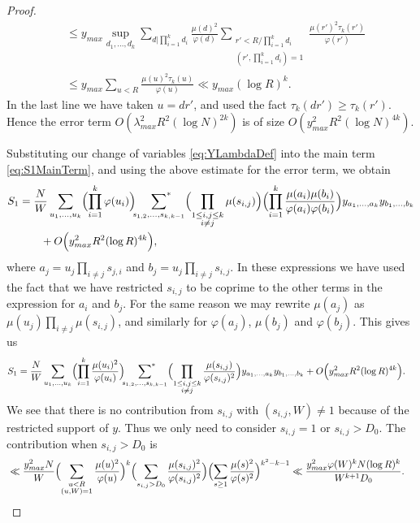 \documentclass[12pt,a4paper]{amsart}
\theoremstyle{plain}
\numberwithin{sblmm}{thrm}
\numberwithin{equation}{section}
\renewcommand{\phi}{\varphi}
\begin{document}
\begin{proof}
\begin{align}
&\le y_{max} \sup_{d_1,\dotsc,d_k}\sum_{d|\prod_{i=1}^kd_i}\frac{\mu(d)^2}{\phi(d)}\sum_{\substack{r'<R/\prod_{i=1}^kd_i\\ (r',\prod_{i=1}^kd_i)=1}}\frac{\mu(r')^2\tau_k(r')}{\phi(r')}\nonumber\\
&\le y_{max}\sum_{u<R}\frac{\mu(u)^2\tau_k(u)}{\phi(u)}\ll y_{max}(\log{R})^k.\label{eq:LambdaSize}
\end{align} 
In the last line we have taken $u=dr'$, and used the fact $\tau_k(dr')\ge\tau_k(r')$. Hence the error term $O(\lambda_{max}^2R^2(\log{N})^{2k})$ is of size $O( y_{max}^2R^2(\log{N})^{4k})$.

Substituting our change of variables \eqref{eq:YLambdaDef} into the main term \eqref{eq:S1MainTerm}, and using the above estimate for the error term, we obtain
\begin{align}
S_1&=\frac{N}{W}\sum_{u_1,\dotsc,u_k}\Bigl(\prod_{i=1}^k\phi(u_i)\Bigr)\sideset{}{^*}\sum_{s_{1,2},\dotsc, s_{k,k-1}} \Bigl(\prod_{\substack{1\le i,j\le k\\i\ne j}}\mu(s_{i,j})\Bigr)\Bigl(\prod_{i=1}^k\frac{\mu(a_i)\mu(b_i)}{\phi(a_i)\phi(b_i)}\Bigr)y_{a_1,\dotsc,a_k}y_{b_1,\dotsc,b_k}\nonumber\\
&\qquad+O\Bigl(y_{max}^2R^2(\log{R})^{4k}\Bigr),
\end{align}
where $a_j=u_j\prod_{i\ne j}s_{j,i}$ and $b_j=u_j\prod_{i\ne j}s_{i,j}$. In these expressions we have used the fact that we have restricted $s_{i,j}$ to be coprime to the other terms in the expression for $a_i$ and $b_j$. For the same reason we may rewrite $\mu(a_j)$ as $\mu(u_j)\prod_{i\ne j}\mu(s_{i,j})$, and similarly for $\phi(a_j)$, $\mu(b_j)$ and $\phi(b_j)$. This gives us
\begin{align}
S_1&=\frac{N}{W}\sum_{u_1,\dotsc,u_k}\Bigl(\prod_{i=1}^k\frac{\mu(u_i)^2}{\phi(u_i)}\Bigr)\sideset{}{^*}\sum_{s_{1,2},\dotsc, s_{k,k-1}} \Bigl(\prod_{\substack{1\le i,j\le k\\i\ne j}}\frac{\mu(s_{i,j})}{\phi(s_{i,j})^2}\Bigr)y_{a_1,\dotsc,a_k}y_{b_1,\dotsc,b_k}+O\Bigl(y_{max}^2R^2(\log{R})^{4k}\Bigr).\label{eq:MultiplicativeSplit}
\end{align}
We see that there is no contribution from $s_{i,j}$ with $(s_{i,j},W)\ne 1$ because of the restricted support of $y$. Thus we only need to consider $s_{i,j}=1$ or $s_{i,j}>D_0$. The contribution when $s_{i,j}>D_0$ is
\begin{align}
&\ll \frac{y_{max}^2 N}{W}\Bigl(\sum_{\substack{u<R\\ (u,W)=1}}\frac{\mu(u)^2}{\phi(u)}\Bigr)^k\Bigl(\sum_{s_{i,j}>D_0}\frac{\mu(s_{i,j})^2}{\phi(s_{i,j})^2}\Bigr)\Bigl(\sum_{s\ge 1}\frac{\mu(s)^2}{\phi(s)^2}\Bigr)^{k^2-k-1}\ll \frac{y_{max}^2 \phi(W)^k N (\log{R})^k}{W^{k+1}D_0}.

\end{align}
\end{proof}
\end{document}
